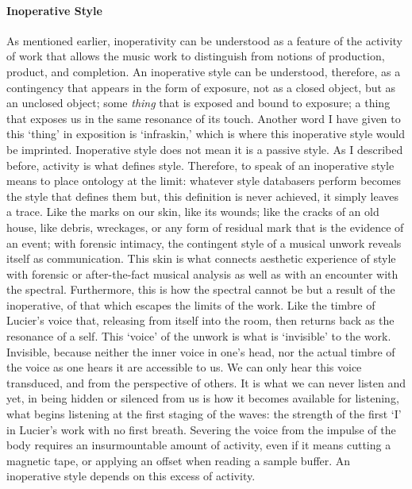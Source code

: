 \paragraph{Inoperative Style}
As mentioned earlier, inoperativity can be understood as a feature of the activity of work that allows the music work to distinguish from notions of production, product, and completion. An inoperative style can be understood, therefore, as a contingency that appears in the form of exposure, not as a closed object, but as an unclosed object; some \textit{thing} that is exposed and bound to exposure; a thing that exposes us in the same resonance of its touch. Another word I have given to this `thing' in exposition is `infraskin,' which is where this inoperative style would be imprinted. Inoperative style does not mean it is a passive style. As I described before, activity is what defines style. Therefore, to speak of an inoperative style means to place ontology at the limit: whatever style databasers perform becomes the style that defines them but, this definition is never achieved, it simply leaves a trace. Like the marks on our skin, like its wounds; like the cracks of an old house, like debris, wreckages, or any form of residual mark that is the evidence of an event; with forensic intimacy, the contingent style of a musical unwork reveals itself as communication. This skin is what connects aesthetic experience of style with forensic or after-the-fact musical analysis as well as with an encounter with the spectral. Furthermore, this is how the spectral cannot be but a result of the inoperative, of that which escapes the limits of the work. Like the timbre of Lucier's voice that, releasing from itself into the room, then returns back as the resonance of a self. This `voice' of the unwork is what is `invisible' to the work. Invisible, because neither the inner voice in one's head, nor the actual timbre of the voice as one hears it are accessible to us. We can only hear this voice transduced, and from the perspective of others. It is what we can never listen and yet, in being hidden or silenced from us is how it becomes available for listening, what begins listening at the first staging of the waves: the strength of the first `I' in Lucier's work with no first breath. Severing the voice from the impulse of the body requires an insurmountable amount of activity, even if it means cutting a magnetic tape, or applying an offset when reading a sample buffer. An inoperative style depends on this excess of activity.
